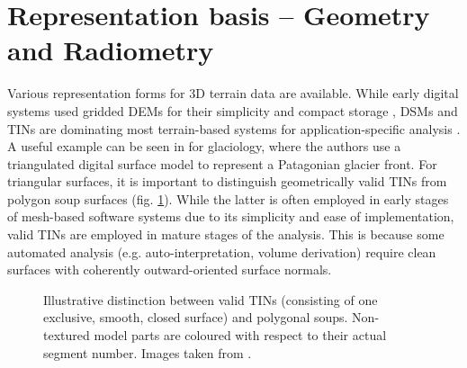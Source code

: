 \documentclass[review]{elsarticle}
\begin{document}
\section{Representation basis -- Geometry and Radiometry}
\label{sec:representations}

Various representation forms for 3D terrain data are available. While early digital systems used gridded \glspl{DEM} for their simplicity and compact storage \cite{Trinks2005,McCaffrey2005}, \glspl{DSM} and \glspl{TIN} are dominating most terrain-based systems for application-specific analysis \cite{Buckley2008a,Caumon2013}. A useful example can be seen in \cite{Schwalbe2017b} for glaciology, where the authors use a  triangulated digital surface model to represent a Patagonian glacier front.
For triangular surfaces, it is important to distinguish geometrically valid \glspl{TIN} from polygon soup surfaces (fig. \ref{fig:representations:meshDistinction}). While the latter is often employed in early stages of mesh-based software systems due to its simplicity and ease of implementation, valid \glspl{TIN} are employed in mature stages of the analysis. This is because some automated analysis (e.g. auto-interpretation, volume derivation) require clean surfaces with coherently outward-oriented surface normals.

\begin{figure}[htbp]
\begin{center}
	 	\begin{minipage}{\columnwidth}
	 		\centering
	 	\end{minipage}
	\caption{Illustrative distinction between valid \glspl{TIN} (consisting of one exclusive, smooth, closed surface) and polygonal soups. Non-textured model parts are coloured with respect to their actual segment number. Images taken from \cite{Kehl2017_PhDThesis}.}
	\label{fig:representations:meshDistinction}
\end{center}
\end{figure}
\end{document}
